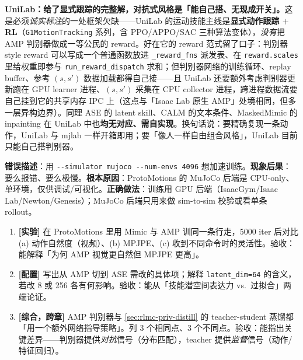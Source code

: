 \textbf{UniLab：给了显式跟踪的完整解，对抗式风格是「能自己搭、无现成开关」。}这是必须\emph{诚实标注}的一处框架欠缺——UniLab 的运动技能主线是\textbf{显式动作跟踪 $+$ RL}（\verb|G1MotionTracking| 系列，含 PPO/APPO/SAC 三种算法变体），\emph{没有}把 AMP 判别器做成一等公民的 reward。好在它的 reward 范式留了口子：判别器 style reward 可以写成一个普通函数放进 \verb|_reward_fns| 派发表、在 \verb|reward.scales| 里给权重即参与 \verb|run_reward_dispatch| 求和；但判别器网络的训练循环、replay buffer、参考 $(s,s')$ 数据加载都得自己接——且 UniLab 还要额外考虑判别器更新跑在 GPU learner 进程、$(s,s')$ 采集在 CPU collector 进程，跨进程数据流要自己挂到它的共享内存 IPC 上（这点与「Isaac Lab 原生 AMP」处境相同，但多一层异构边界）。同理 ASE 的 latent skill、CALM 的文本条件、MaskedMimic 的 inpainting 在 UniLab 中也\textbf{均无对应、需自实现}。换句话说：要精确复现一条动作，UniLab 与 mjlab 一样开箱即用；要「像人一样自由组合风格」，UniLab 目前只能自己搭判别器。

\begin{pitfall}[ProtoMotions 的 MuJoCo 后端只能 num\_envs=1]
\textbf{错误描述}：用 \verb|--simulator mujoco --num-envs 4096| 想加速训练。\textbf{现象后果}：要么报错、要么极慢。\textbf{根本原因}：ProtoMotions 的 MuJoCo 后端是 CPU-only、单环境，仅供调试/可视化。\textbf{正确做法}：训练用 GPU 后端（IsaacGym/Isaac Lab/Newton/Genesis）；MuJoCo 后端只用来做 sim-to-sim 校验或看单条 rollout。
\end{pitfall}

\begin{practice}[本节练习]
\begin{enumerate}
  \item \textbf{[实验]} 在 ProtoMotions 里用 Mimic 与 AMP 训同一条行走，5000 iter 后对比 (a) 动作自然度（视频）、(b) MPJPE、(c) 收到不同命令时的灵活性。验收：能解释「为何 AMP 视觉更自然但 MPJPE 更高」。
  \item \textbf{[配置]} 写出从 AMP 切到 ASE 需改的具体项；解释 \verb|latent_dim=64| 的含义，若改 8 或 256 各有何影响。验收：能从「技能潜空间表达力 vs.\ 过拟合」两端论证。
  \item \textbf{[综合，跨章]} AMP 判别器与 \cref{sec:rlmc-priv-distill} 的 teacher-student 蒸馏都「用一个额外网络指导策略」。列 3 个相同点、3 个不同点。验收：能指出关键差异——判别器提供\emph{对抗}信号（分布匹配），teacher 提供\emph{监督}信号（动作/特征回归）。
\end{enumerate}
\end{practice}

